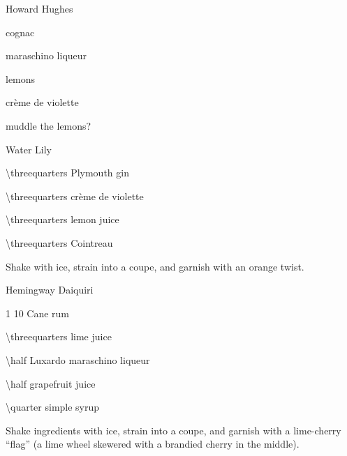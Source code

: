 \begin{CCCocktail}{Howard Hughes}
	\begin{Ingredients}
	\item cognac
	\item maraschino liqueur
	\item lemons
	\item cr\`eme de violette
	\end{Ingredients}
	
	\begin{Instructions}
	muddle the lemons?
	\end{Instructions}
\end{CCCocktail}

\begin{PDTCocktail}{Water Lily}
	\begin{Ingredients}
	\item \SI{\threequarters}{\oz} Plymouth gin
	\item \SI{\threequarters}{\oz} cr\`eme de violette
	\item \SI{\threequarters}{\oz} lemon juice
	\item \SI{\threequarters}{\oz} Cointreau
	\end{Ingredients}
	
	\begin{Instructions}
	Shake with ice, strain into a coupe, and garnish with an orange twist.
	\end{Instructions}
\end{PDTCocktail}

\begin{Cocktail}{Hemingway Daiquiri}
	\begin{Ingredients}
	\item \SI{1}{\oz} 10 Cane rum
	\item \SI{\threequarters}{\oz} lime juice
	\item \SI{\half}{\oz} Luxardo maraschino liqueur
	\item \SI{\half}{\oz} grapefruit juice
	\item \SI{\quarter}{\oz} simple syrup
	\end{Ingredients}
	
	\begin{Instructions}
	Shake ingredients with ice, strain into a coupe, and garnish with a lime-cherry ``flag'' (a lime wheel skewered with a brandied cherry in the middle).
	\end{Instructions}
\end{Cocktail}


